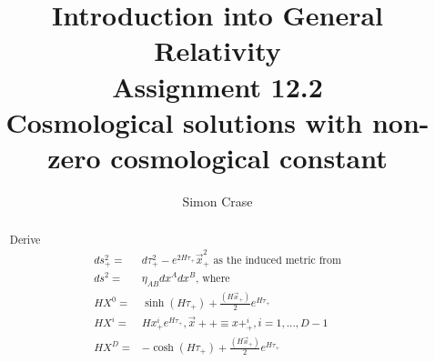 \documentclass[]{article}
\title{Introduction into General Relativity\\Assignment 12.2\\Cosmological solutions with non-zero cosmological constant}
\author{Simon Crase}
\begin{document}
\maketitle

\begin{abstract}
Derive 
\begin{align*}
ds^2_+=&d\tau^2_+ - e^{2H\tau_+}\vec{x}^2_+\text{ as the induced metric from}\\
ds^2=&\eta_{AB}dx^Adx^B\text{, where}\\
HX^0=&\sinh(H\tau_+)+\frac{(H\vec{x}_+)}{2}e^{H\tau_+}\\
HX^i=&Hx^i_+e^{H\tau_+}, \vec{x}++\equiv x+^i_+, i=1,...,D-1\\
HX^D=&-\cosh(H\tau_+)+\frac{(H\vec{x}_+)}{2}e^{H\tau_+}
\end{align*}
\end{abstract}

\section{}
\end{document}
